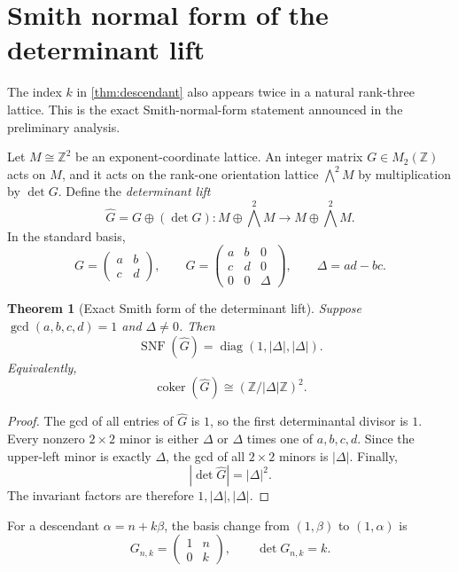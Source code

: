 \documentclass[11pt]{article}
\numberwithin{equation}{section}
\newtheorem{theorem}{Theorem}[section]
\theoremstyle{definition}
\newcommand{\Z}{\mathbb{Z}}
\newcommand{\SNF}{\operatorname{SNF}}
\begin{document}
\section{Smith normal form of the determinant lift}

The index \(k\) in \cref{thm:descendant} also appears twice in a natural rank-three lattice. This is the exact Smith-normal-form statement announced in the preliminary analysis.

Let \(M\cong\Z^2\) be an exponent-coordinate lattice. An integer matrix \(G\in M_2(\Z)\) acts on \(M\), and it acts on the rank-one orientation lattice \(\bigwedge^2M\) by multiplication by \(\det G\). Define the \emph{determinant lift}
\[
       \widehat G=G\oplus(\det G)
       :M\oplus\bigwedge^2M\longrightarrow
        M\oplus\bigwedge^2M.
\]
In the standard basis,
\[
  G=\begin{pmatrix}a&b\\c&d\end{pmatrix},
  \qquad
  \widehat G=
  \begin{pmatrix}
     a&b&0\\
     c&d&0\\
     0&0&\Delta
  \end{pmatrix},
  \qquad \Delta=ad-bc.
\]

\begin{theorem}[Exact Smith form of the determinant lift]\label{thm:snflift}
Suppose \(\gcd(a,b,c,d)=1\) and \(\Delta\ne0\). Then
\begin{equation}\label{eq:snflift}
       \SNF(\widehat G)=
       \operatorname{diag}(1,|\Delta|,|\Delta|).
\end{equation}
Equivalently,
\[
  \operatorname{coker}(\widehat G)
       \cong (\Z/|\Delta|\Z)^2.
\]
\end{theorem}

\begin{proof}
The gcd of all entries of \(\widehat G\) is \(1\), so the first determinantal divisor is \(1\). Every nonzero \(2\times2\) minor is either \(\Delta\) or \(\Delta\) times one of \(a,b,c,d\). Since the upper-left minor is exactly \(\Delta\), the gcd of all \(2\times2\) minors is \(|\Delta|\). Finally,
\[
       |\det\widehat G|=|\Delta|^2.
\]
The invariant factors are therefore \(1,|\Delta|,|\Delta|\).
\end{proof}

For a descendant \(\alpha=n+k\beta\), the basis change from \((1,\beta)\) to \((1,\alpha)\) is
\[
       G_{n,k}=
       \begin{pmatrix}1&n\\0&k\end{pmatrix},
       \qquad \det G_{n,k}=k.
\]
\end{document}
